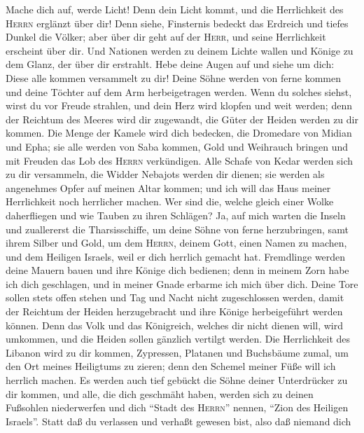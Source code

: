  Mache dich auf, werde Licht! Denn dein Licht kommt, und
die Herrlichkeit des \textsc{Herrn} erglänzt über dir! 
Denn siehe, Finsternis bedeckt das Erdreich und tiefes Dunkel die
Völker; aber über dir geht auf der \textsc{Herr}, und seine Herrlichkeit
erscheint über dir.  Und Nationen werden zu deinem Lichte
wallen und Könige zu dem Glanz, der über dir erstrahlt. 
Hebe deine Augen auf und siehe um dich: Diese alle kommen versammelt zu
dir! Deine Söhne werden von ferne kommen und deine Töchter auf dem Arm
herbeigetragen werden.  Wenn du solches siehst, wirst du
vor Freude strahlen, und dein Herz wird klopfen und weit werden; denn
der Reichtum des Meeres wird dir zugewandt, die Güter der Heiden werden
zu dir kommen.  Die Menge der Kamele wird dich bedecken,
die Dromedare von Midian und Epha; sie alle werden von Saba kommen, Gold
und Weihrauch bringen und mit Freuden das Lob des \textsc{Herrn}
verkündigen.  Alle Schafe von Kedar werden sich zu dir
versammeln, die Widder Nebajots werden dir dienen; sie werden als
angenehmes Opfer auf meinen Altar kommen; und ich will das Haus meiner
Herrlichkeit noch herrlicher machen.  Wer sind die, welche
gleich einer Wolke daherfliegen und wie Tauben zu ihren Schlägen?
 Ja, auf mich warten die Inseln und zuallererst die
Tharsisschiffe, um deine Söhne von ferne herzubringen, samt ihrem Silber
und Gold, um dem \textsc{Herrn}, deinem Gott, einen Namen zu machen, und
dem Heiligen Israels, weil er dich herrlich gemacht hat. 
Fremdlinge werden deine Mauern bauen und ihre Könige dich bedienen; denn
in meinem Zorn habe ich dich geschlagen, und in meiner Gnade erbarme ich
mich über dich.  Deine Tore sollen stets offen stehen und
Tag und Nacht nicht zugeschlossen werden, damit der Reichtum der Heiden
herzugebracht und ihre Könige herbeigeführt werden können.
 Denn das Volk und das Königreich, welches dir nicht
dienen will, wird umkommen, und die Heiden sollen gänzlich vertilgt
werden.  Die Herrlichkeit des Libanon wird zu dir kommen,
Zypressen, Platanen und Buchsbäume zumal, um den Ort meines Heiligtums
zu zieren; denn den Schemel meiner Füße will ich herrlich machen.
 Es werden auch tief gebückt die Söhne deiner
Unterdrücker zu dir kommen, und alle, die dich geschmäht haben, werden
sich zu deinen Fußsohlen niederwerfen und dich ``Stadt des
\textsc{Herrn}'' nennen, ``Zion des Heiligen Israels''. 
Statt daß du verlassen und verhaßt gewesen bist, also daß niemand dich
